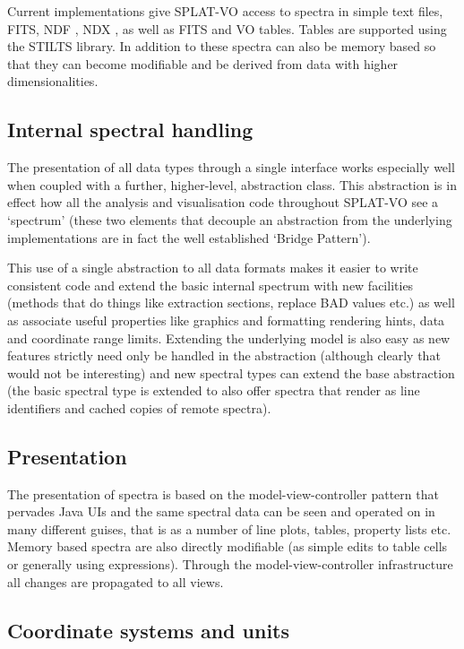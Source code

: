 \documentclass[final,authoryear,5p,times,twocolumn]{elsarticle}
\begin{document}
Current implementations give SPLAT-VO access to spectra in simple text
files, FITS, NDF \citep{ndfjenness}, NDX \citep{2003ASPC..295..221G},
as well as FITS and VO tables. Tables are supported using the STILTS 
\citep[][]{2006ASPC..351..666T} library. In addition to these
spectra can also be memory based so that they can become modifiable and be
derived from data with higher dimensionalities.

\subsection{Internal spectral handling}

The presentation of all data types through a single interface works especially
well when coupled with a further, higher-level, abstraction class. This
abstraction is in effect how all the analysis and visualisation code
throughout SPLAT-VO see a `spectrum' (these two elements that decouple an
abstraction from the underlying implementations are in fact the well
established `Bridge Pattern').

This use of a single abstraction to all data formats makes it easier to write
consistent code and extend the basic internal spectrum with new facilities
(methods that do things like extraction sections, replace BAD values etc.) as
well as associate useful properties like graphics and formatting rendering
hints, data and coordinate range limits. Extending the underlying model is
also easy as new features strictly need only be handled in the abstraction
(although clearly that would not be interesting) and new spectral types can
extend the base abstraction (the basic spectral type is extended to also offer
spectra that render as line identifiers and cached copies of remote spectra).


\subsection{Presentation}

The presentation of spectra is based on the model-view-controller pattern that
pervades Java UIs and the same spectral data can be seen and operated on in
many different guises, that is as a number of line plots, tables, property
lists etc. Memory based spectra are also directly modifiable (as simple edits
to table cells or generally using expressions). Through the
model-view-controller infrastructure all changes are propagated to all views.


\subsection{Coordinate systems and units}
\end{document}
